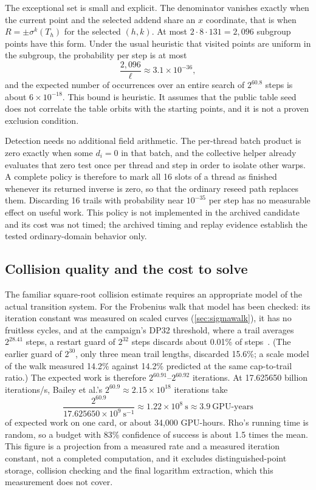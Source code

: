 \documentclass[11pt,a4paper]{article}
\begin{document}
The exceptional set is small and explicit. The denominator vanishes exactly when the current point and the selected addend share an $x$ coordinate, that is when $R=\pm\sigma^{k}(T_h)$ for the selected $(h,k)$. At most $2\cdot8\cdot131=2{,}096$ subgroup points have this form. Under the usual heuristic that visited points are uniform in the subgroup, the probability per step is at most
\begin{equation}
 \frac{2{,}096}{\ell}\approx3.1\times10^{-36},
\end{equation}
and the expected number of occurrences over an entire search of $2^{60.8}$ steps is about $6\times10^{-18}$. This bound is heuristic. It assumes that the public table seed does not correlate the table orbits with the starting points, and it is not a proven exclusion condition.

Detection needs no additional field arithmetic. The per-thread batch product is zero exactly when some $d_i=0$ in that batch, and the collective helper already evaluates that zero test once per thread and step in order to isolate other warps. A complete policy is therefore to mark all 16 slots of a thread as finished whenever its returned inverse is zero, so that the ordinary reseed path replaces them. Discarding 16 trails with probability near $10^{-35}$ per step has no measurable effect on useful work. This policy is not implemented in the archived candidate and its cost was not timed; the archived timing and replay evidence establish the tested ordinary-domain behavior only.

\subsection{Collision quality and the cost to solve}\label{sec:cost}
The familiar square-root collision estimate requires an appropriate model of the actual transition system. For the Frobenius walk that model has been checked: its iteration constant was measured on scaled curves (\cref{sec:sigmawalk}), it has no fruitless cycles, and at the campaign's DP32 threshold, where a trail averages $2^{28.41}$ steps, a restart guard of $2^{32}$ steps discards about 0.01\% of steps~\cite{walkconstant}. (The earlier guard of $2^{30}$, only three mean trail lengths, discarded 15.6\%; a scale model of the walk measured 14.2\% against 14.2\% predicted at the same cap-to-trail ratio.) The expected work is therefore $2^{60.91}$--$2^{60.92}$ iterations. At 17.625650 billion iterations/s, Bailey et al.'s $2^{60.9}\approx2.15\times10^{18}$ iterations take
\begin{equation}
 \frac{2^{60.9}}{17.625650\times10^{9}\ \mathrm{s}^{-1}}\approx1.22\times10^{8}\ \mathrm{s}\approx3.9\ \text{GPU-years}
\end{equation}
of expected work on one card, or about 34,000 GPU-hours. Rho's running time is random, so a budget with 83\% confidence of success is about 1.5 times the mean. This figure is a projection from a measured rate and a measured iteration constant, not a completed computation, and it excludes distinguished-point storage, collision checking and the final logarithm extraction, which this measurement does not cover.
\end{document}
